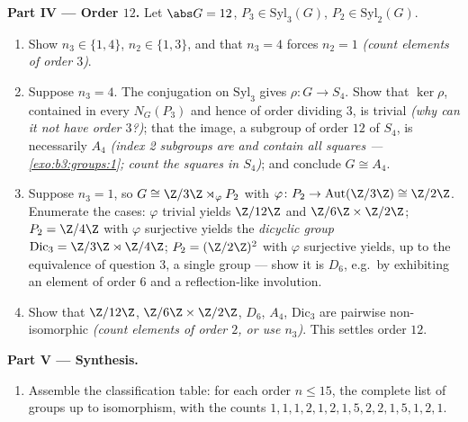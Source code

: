 \begin{problem}
\medskip
\noindent\textbf{Part IV --- Order $12$.} Let $\abs G = 12$, $P_3
\in \mathrm{Syl}_3(G)$, $P_2 \in \mathrm{Syl}_2(G)$.
\begin{enumerate}[resume]
  \item Show $n_3 \in \{1, 4\}$, $n_2 \in \{1, 3\}$, and that $n_3
        = 4$ forces $n_2 = 1$ \emph{(count elements of order
        $3$)}.
  \item Suppose $n_3 = 4$. The conjugation  on
        $\mathrm{Syl}_3$ gives $\rho \colon G \to S_4$. Show that
        $\ker \rho$, contained in every $N_G(P_3)$ and hence of
        order dividing $3$, is trivial \emph{(why can it not have
        order $3$?)}; that the image, a subgroup of order $12$ of
        $S_4$, is necessarily $A_4$ \emph{(index 2 subgroups are
         and contain all squares ---
        \cref{exo:b3:groups:1}; count the squares in $S_4$)}; and
        conclude $G \cong A_4$.
  \item Suppose $n_3 = 1$, so $G \cong \Z/3\Z \rtimes_\varphi P_2$
        with $\varphi \colon P_2 \to \operatorname{Aut}(\Z/3\Z)
        \cong \Z/2\Z$. Enumerate the cases: $\varphi$ trivial
        yields $\Z/12\Z$ and $\Z/6\Z \times \Z/2\Z$; $P_2 =
        \Z/4\Z$ with $\varphi$ surjective yields the
        \emph{dicyclic group} $\mathrm{Dic}_3 = \Z/3\Z \rtimes
        \Z/4\Z$; $P_2 = (\Z/2\Z)^2$ with $\varphi$ surjective
        yields, up to the equivalence of question 3, a single
        group --- show it is $D_6$, e.g.\ by exhibiting an element
        of order $6$ and a reflection-like involution.
  \item Show that $\Z/12\Z$, $\Z/6\Z \times \Z/2\Z$, $D_6$, $A_4$,
        $\mathrm{Dic}_3$ are pairwise non-isomorphic \emph{(count
        elements of order $2$, or use $n_3$)}. This settles order
        $12$.
\end{enumerate}

\medskip
\noindent\textbf{Part V --- Synthesis.}
\begin{enumerate}[resume]
  \item Assemble the classification table: for each order $n \leq
        15$, the complete list of groups up to isomorphism, with
        the counts $1, 1, 1, 2, 1, 2, 1, 5, 2, 2, 1, 5, 1, 2, 1$.
\end{enumerate}


\end{problem}
